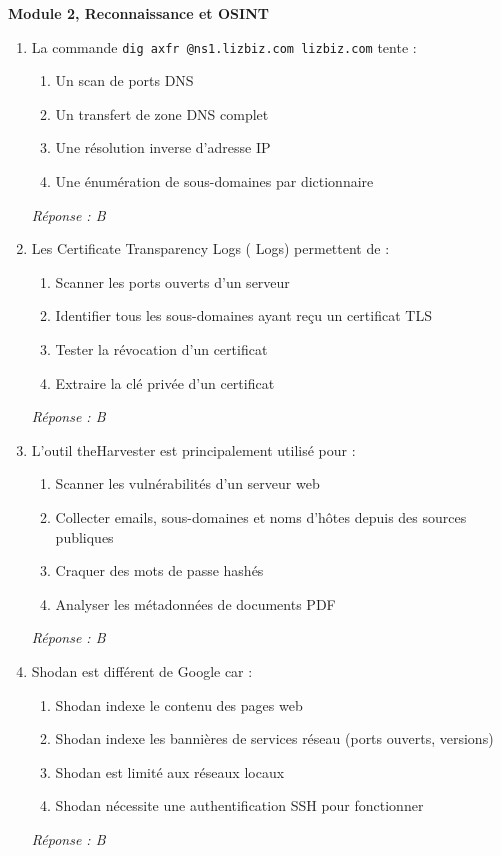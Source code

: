 \medskip
\noindent\textbf{Module 2, Reconnaissance et OSINT}

\begin{enumerate}[resume]

\item La commande \texttt{dig axfr @ns1.lizbiz.com lizbiz.com} tente :
\begin{enumerate}[label=\Alph*.]
    \item Un scan de ports DNS
    \item Un transfert de zone DNS complet
    \item Une résolution inverse d'adresse IP
    \item Une énumération de sous-domaines par dictionnaire
\end{enumerate}
\textit{Réponse : B}

\item Les Certificate Transparency Logs ( Logs) permettent de :
\begin{enumerate}[label=\Alph*.]
    \item Scanner les ports ouverts d'un serveur
    \item Identifier tous les sous-domaines ayant reçu un certificat TLS
    \item Tester la révocation d'un certificat
    \item Extraire la clé privée d'un certificat
\end{enumerate}
\textit{Réponse : B}

\item L'outil theHarvester est principalement utilisé pour :
\begin{enumerate}[label=\Alph*.]
    \item Scanner les vulnérabilités d'un serveur web
    \item Collecter emails, sous-domaines et noms d'hôtes depuis des sources publiques
    \item Craquer des mots de passe hashés
    \item Analyser les métadonnées de documents PDF
\end{enumerate}
\textit{Réponse : B}

\item Shodan est différent de Google car :
\begin{enumerate}[label=\Alph*.]
    \item Shodan indexe le contenu des pages web
    \item Shodan indexe les bannières de services réseau (ports ouverts, versions)
    \item Shodan est limité aux réseaux locaux
    \item Shodan nécessite une authentification SSH pour fonctionner
\end{enumerate}
\textit{Réponse : B}

\end{enumerate}

